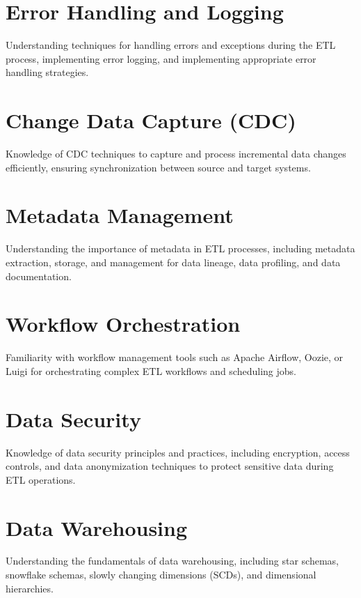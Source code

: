 \section{Error Handling and Logging}

Understanding techniques for handling errors and exceptions during the ETL process, implementing error logging, and implementing appropriate error handling strategies.

\section{Change Data Capture (CDC)}

Knowledge of CDC techniques to capture and process incremental data changes efficiently, ensuring synchronization between source and target systems.

\section{Metadata Management}

Understanding the importance of metadata in ETL processes, including metadata extraction, storage, and management for data lineage, data profiling, and data documentation.

\section{Workflow Orchestration}

Familiarity with workflow management tools such as Apache Airflow, Oozie, or Luigi for orchestrating complex ETL workflows and scheduling jobs.

\section{Data Security}

Knowledge of data security principles and practices, including encryption, access controls, and data anonymization techniques to protect sensitive data during ETL operations.

\section{Data Warehousing}

Understanding the fundamentals of data warehousing, including star schemas, snowflake schemas, slowly changing dimensions (SCDs), and dimensional hierarchies.

